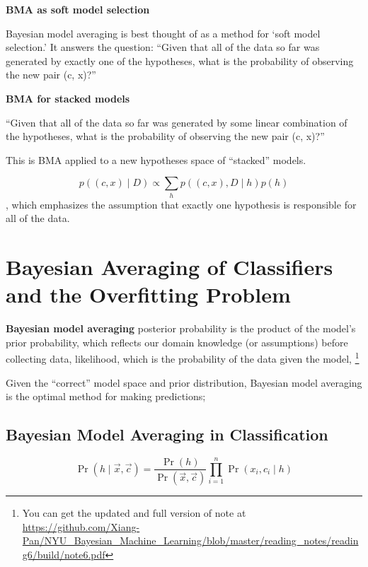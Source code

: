\documentclass{article}
\begin{document}
\textbf{BMA as soft model selection}

Bayesian model averaging is best thought of as a method for ‘soft model selection.’ It answers the question: “Given that all of the data so far was generated by exactly one of the hypotheses, what is the probability of observing the new pair (c, x)?”

\textbf{BMA for stacked models}

“Given that all of the data so far was generated by some linear combination of the hypotheses, what is the probability of observing the new pair (c, x)?”

This is BMA applied to a new hypotheses space of “stacked” models. 

\begin{equation}
    p((c, x) \mid D) \propto \sum_{h} p((c, x), D \mid h) p(h)
\end{equation},
which emphasizes the assumption that exactly one hypothesis is responsible for all of the data.

\section{Bayesian Averaging of Classiﬁers and the Overﬁtting Problem\cite{domingos__BayesianAveragingClassifiers}}
\textbf{Bayesian model averaging}
posterior probability is the product of the model’s prior probability, which reﬂects our domain knowledge (or assumptions) before collecting data, likelihood, which is the probability of the data given the model, \footnote{You can get the updated and full version of note at \url{https://github.com/Xiang-Pan/NYU_Bayesian_Machine_Learning/blob/master/reading_notes/reading6/build/note6.pdf}}

Given the “correct” model space and prior distribution, Bayesian model averaging is the optimal method for making predictions; 

\subsection{Bayesian Model Averaging in Classiﬁcation}

\begin{equation}
    \operatorname{Pr}(h \mid \vec{x}, \vec{c})=\frac{\operatorname{Pr}(h)}{\operatorname{Pr}(\vec{x}, \vec{c})} \prod_{i=1}^{n} \operatorname{Pr}\left(x_{i}, c_{i} \mid h\right)
\end{equation}
\end{document}
